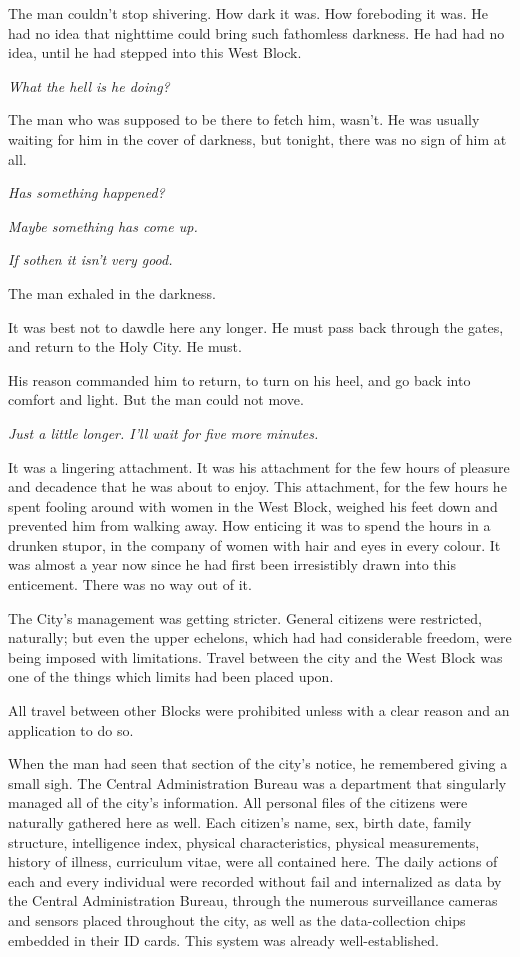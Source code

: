 The man couldn't stop shivering. How dark it was. How foreboding it was.
He had no idea that nighttime could bring such fathomless darkness. He
had had no idea, until he had stepped into this West Block.

\emph{What the hell is he doing?}

The man who was supposed to be there to fetch him, wasn't. He was
usually waiting for him in the cover of darkness, but tonight, there was
no sign of him at all.

\emph{Has something happened?}

\emph{Maybe something has come up.}

\emph{If so\el then it isn't very good.}

The man exhaled in the darkness.

It was best not to dawdle here any longer. He must pass back through the
gates, and return to the Holy City. He must.

His reason commanded him to return, to turn on his heel, and go back
into comfort and light. But the man could not move.

\emph{Just a little longer. I'll wait for five more minutes.}

It was a lingering attachment. It was his attachment for the few hours
of pleasure and decadence that he was about to enjoy. This attachment,
for the few hours he spent fooling around with women in the West Block,
weighed his feet down and prevented him from walking away. How enticing
it was to spend the hours in a drunken stupor, in the company of women
with hair and eyes in every colour. It was almost a year now since he
had first been irresistibly drawn into this enticement. There was no way
out of it.

The City's management was getting stricter. General citizens were
restricted, naturally; but even the upper echelons, which had had
considerable freedom, were being imposed with limitations. Travel
between the city and the West Block was one of the things which limits
had been placed upon.

\myspace

All travel between other Blocks were prohibited unless with a clear
reason and an application to do so.

When the man had seen that section of the city's notice, he remembered
giving a small sigh. The Central Administration Bureau was a department
that singularly managed all of the city's information. All personal
files of the citizens were naturally gathered here as well. Each
citizen's name, sex, birth date, family structure, intelligence index,
physical characteristics, physical measurements, history of illness,
curriculum vitae, were all contained here. The daily actions of each and
every individual were recorded without fail and internalized as data by
the Central Administration Bureau, through the numerous surveillance
cameras and sensors placed throughout the city, as well as the
data-collection chips embedded in their ID cards. This system was
already well-established.

